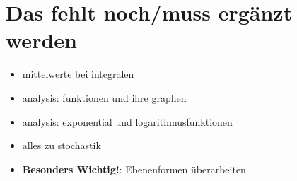\chapter{Das fehlt noch/muss ergänzt werden}
\begin{itemize}
    \item mittelwerte bei integralen
    \item analysis: funktionen und ihre graphen
    \item analysis: exponential und logarithmusfunktionen
    \item alles zu stochastik
    \item \textbf{Besonders Wichtig!}: Ebenenformen überarbeiten 
\end{itemize}
